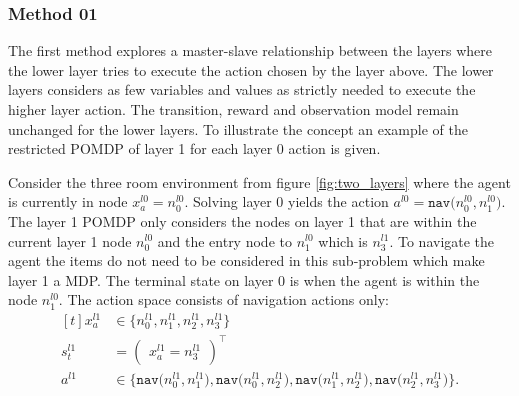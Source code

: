 \subsubsection{Method 01}\label{subsec:M1}
The first method explores a master-slave relationship between the layers where the lower layer tries to execute the action chosen by the layer above. The lower layers considers as few variables and values as strictly needed to execute the higher layer action. The transition, reward and observation model remain unchanged for the lower layers. To illustrate the concept an example of the restricted POMDP of layer 1 for each layer 0 action is given.
\begin{example}\label{ex:M1_nav}
Consider the three room environment from figure \ref{fig:two_layers} where the agent is currently in node $x_a^{l0}=n_0^{l0}$. Solving layer 0 yields the action $a^{l0}=\texttt{nav($n_0^{l0},n_1^{l0}$)}$. The layer 1 POMDP only considers the nodes on layer 1 that are within the current layer 1 node $n_0^{l0}$ and the entry node to $n_1^{l0}$ which is $n_3^{l1}$. To navigate the agent the items do not need to be considered in this sub-problem which make layer 1 a MDP. The terminal state on layer 0 is when the agent is within the node $n_1^{l0}$. The action space consists of navigation actions only:
\begin{equation}
     \begin{aligned}[t] 
        x_a^{l1} &\in \big\{n_0^{l1}, n_1^{l1}, n_2^{l1}, n_3^{l1}  \big\} \\
        s_t^{l1} &= \begin{pmatrix}x_a^{l1}=n_3^{l1} \end{pmatrix}^\intercal\\
        a^{l1} &\in \big\{\texttt{nav($n_0^{l1}, n_1^{l1}$)}, \texttt{nav($n_0^{l1}, n_2^{l1}$)}, \texttt{nav($n_1^{l1}, n_2^{l1}$)},\texttt{nav($n_2^{l1}, n_3^{l1}$)} \big\}.
    \end{aligned}
\end{equation}
\demo
\end{example}

